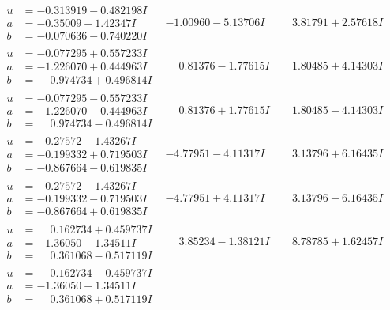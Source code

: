 \documentclass[1p]{elsarticle_modified}
\theoremstyle{definition}
\begin{document}
$$\begin{array}{c|c|c}
\begin{aligned}
u &= -0.313919 - 0.482198 I \\
a &= -0.35009 - 1.42347 I \\
b &= -0.070636 - 0.740220 I\end{aligned}
 & -1.00960 - 5.13706 I & \phantom{-}3.81791 + 2.57618 I \\ \hline\begin{aligned}
u &= -0.077295 + 0.557233 I \\
a &= -1.226070 + 0.444963 I \\
b &= \phantom{-}0.974734 + 0.496814 I\end{aligned}
 & \phantom{-}0.81376 - 1.77615 I & \phantom{-}1.80485 + 4.14303 I \\ \hline\begin{aligned}
u &= -0.077295 - 0.557233 I \\
a &= -1.226070 - 0.444963 I \\
b &= \phantom{-}0.974734 - 0.496814 I\end{aligned}
 & \phantom{-}0.81376 + 1.77615 I & \phantom{-}1.80485 - 4.14303 I \\ \hline\begin{aligned}
u &= -0.27572 + 1.43267 I \\
a &= -0.199332 + 0.719503 I \\
b &= -0.867664 - 0.619835 I\end{aligned}
 & -4.77951 - 4.11317 I & \phantom{-}3.13796 + 6.16435 I \\ \hline\begin{aligned}
u &= -0.27572 - 1.43267 I \\
a &= -0.199332 - 0.719503 I \\
b &= -0.867664 + 0.619835 I\end{aligned}
 & -4.77951 + 4.11317 I & \phantom{-}3.13796 - 6.16435 I \\ \hline\begin{aligned}
u &= \phantom{-}0.162734 + 0.459737 I \\
a &= -1.36050 - 1.34511 I \\
b &= \phantom{-}0.361068 - 0.517119 I\end{aligned}
 & \phantom{-}3.85234 - 1.38121 I & \phantom{-}8.78785 + 1.62457 I \\ \hline\begin{aligned}
u &= \phantom{-}0.162734 - 0.459737 I \\
a &= -1.36050 + 1.34511 I \\
b &= \phantom{-}0.361068 + 0.517119 I\end{aligned}

\end{array}$$
\end{document}
